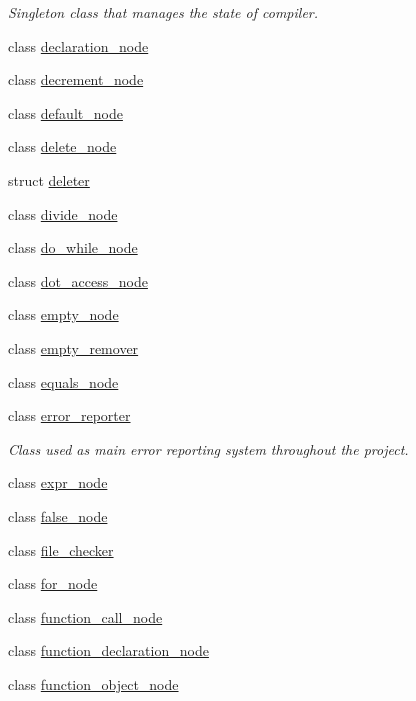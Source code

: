 \begin{DoxyCompactItemize}
\begin{DoxyCompactList}\small\item\em Singleton class that manages the state of compiler. \end{DoxyCompactList}\item 
class \hyperlink{classjawe_1_1declaration__node}{declaration\+\_\+node}
\item 
class \hyperlink{classjawe_1_1decrement__node}{decrement\+\_\+node}
\item 
class \hyperlink{classjawe_1_1default__node}{default\+\_\+node}
\item 
class \hyperlink{classjawe_1_1delete__node}{delete\+\_\+node}
\item 
struct \hyperlink{structjawe_1_1deleter}{deleter}
\item 
class \hyperlink{classjawe_1_1divide__node}{divide\+\_\+node}
\item 
class \hyperlink{classjawe_1_1do__while__node}{do\+\_\+while\+\_\+node}
\item 
class \hyperlink{classjawe_1_1dot__access__node}{dot\+\_\+access\+\_\+node}
\item 
class \hyperlink{classjawe_1_1empty__node}{empty\+\_\+node}
\item 
class \hyperlink{classjawe_1_1empty__remover}{empty\+\_\+remover}
\item 
class \hyperlink{classjawe_1_1equals__node}{equals\+\_\+node}
\item 
class \hyperlink{classjawe_1_1error__reporter}{error\+\_\+reporter}
\begin{DoxyCompactList}\small\item\em Class used as main error reporting system throughout the project. \end{DoxyCompactList}\item 
class \hyperlink{classjawe_1_1expr__node}{expr\+\_\+node}
\item 
class \hyperlink{classjawe_1_1false__node}{false\+\_\+node}
\item 
class \hyperlink{classjawe_1_1file__checker}{file\+\_\+checker}
\item 
class \hyperlink{classjawe_1_1for__node}{for\+\_\+node}
\item 
class \hyperlink{classjawe_1_1function__call__node}{function\+\_\+call\+\_\+node}
\item 
class \hyperlink{classjawe_1_1function__declaration__node}{function\+\_\+declaration\+\_\+node}
\item 
class \hyperlink{classjawe_1_1function__object__node}{function\+\_\+object\+\_\+node}

\end{DoxyCompactItemize}
